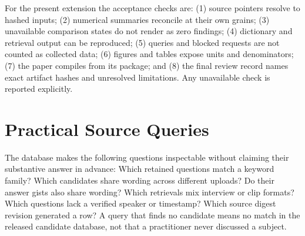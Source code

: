 For the present extension the acceptance checks are: (1) source pointers resolve to hashed inputs; (2) numerical summaries reconcile at their own grains; (3) unavailable comparison states do not render as zero findings; (4) dictionary and retrieval output can be reproduced; (5) queries and blocked requests are not counted as collected data; (6) figures and tables expose units and denominators; (7) the paper compiles from its package; and (8) the final review record names exact artifact hashes and unresolved limitations. Any unavailable check is reported explicitly.

\section{Practical Source Queries}
The database makes the following questions inspectable without claiming their substantive answer in advance: Which retained questions match a keyword family? Which candidates share wording across different uploads? Do their answer gists also share wording? Which retrievals mix interview or clip formats? Which questions lack a verified speaker or timestamp? Which source digest revision generated a row? A query that finds no candidate means no match in the released candidate database, not that a practitioner never discussed a subject.

